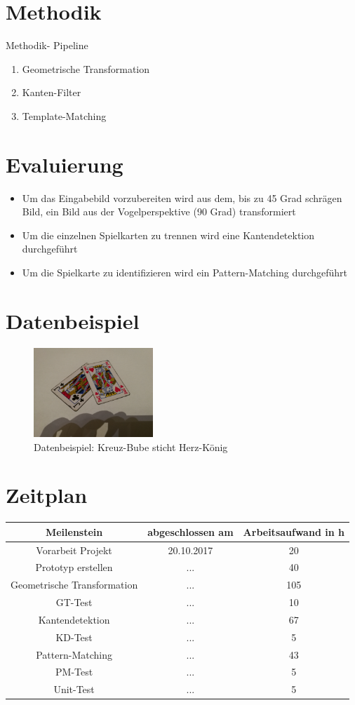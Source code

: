 \documentclass[deutsch]{scrartcl}
\begin{document}
\section{Methodik}
Methodik- Pipeline
\begin{enumerate}
	\item Geometrische Transformation
	\item Kanten-Filter
	\item Template-Matching
\end{enumerate}
\section{Evaluierung}
\begin{itemize}
	\item Um das Eingabebild vorzubereiten wird aus dem, bis zu 45 Grad schrägen Bild, ein Bild aus der Vogelperspektive (90 Grad) transformiert
	\item Um die einzelnen Spielkarten zu trennen wird eine Kantendetektion durchgeführt
	\item Um die Spielkarte zu identifizieren wird ein Pattern-Matching durchgeführt
\end{itemize}
\section{Datenbeispiel}
\begin{figure}[h!]
 \centering
 \includegraphics[width=0.4\textwidth]{datenbeispiel.jpg}
 \caption{Datenbeispiel: Kreuz-Bube sticht Herz-König}
 \label{fig:img}
\end{figure}
\newpage
\section{Zeitplan}
\begin{table}[h!]
	\centering
		\begin{tabular}{|c|c|c|}
		\hline
		Meilenstein & abgeschlossen am & Arbeitsaufwand in h\\
		\hline
		Vorarbeit Projekt & 20.10.2017 & 20\\
		Prototyp erstellen& ... & 40\\
		Geometrische Transformation& ... & 105 \\
		GT-Test & ... & 10 \\
		Kantendetektion& ... & 67 \\
		KD-Test & ... & 5 \\
		Pattern-Matching & ... & 43\\
		PM-Test & ... & 5 \\
		Unit-Test & ... & 5 \\
		\hline
		\end{tabular}
\end{table}
\nocite{*}

{}
\end{document}
